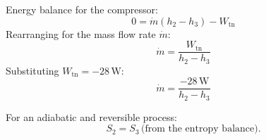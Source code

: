 Energy balance for the compressor:  
\[
0 = \dot{m} (h_2 - h_3) - W_{\text{tn}}
\]
Rearranging for the mass flow rate \( \dot{m} \):  
\[
\dot{m} = \frac{W_{\text{tn}}}{h_2 - h_3}
\]
Substituting \( W_{\text{tn}} = -28 \, \text{W} \):  
\[
\dot{m} = \frac{-28 \, \text{W}}{h_2 - h_3}
\]

For an adiabatic and reversible process:  
\[
S_2 = S_3 \, \text{(from the entropy balance).}
\]